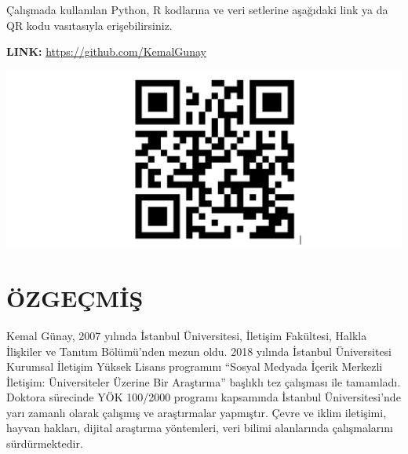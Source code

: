 \documentclass[
]{book}
\begin{document}
Çalışmada kullanılan Python, R kodlarına ve veri setlerine aşağıdaki link ya da QR kodu vasıtasıyla erişebilirsiniz.

\textbf{LINK:} \url{https://github.com/KemalGunay}

\includegraphics[width=0.95\linewidth,height=0.95\textheight]{tablolar-sekiller/karekod}

\hypertarget{uxf6zgeuxe7miux15f}{%
\chapter*{ÖZGEÇMİŞ}\label{uxf6zgeuxe7miux15f}}

Kemal Günay, 2007 yılında İstanbul Üniversitesi, İletişim Fakültesi, Halkla İlişkiler ve Tanıtım Bölümü'nden mezun oldu. 2018 yılında İstanbul Üniversitesi Kurumsal İletişim Yüksek Lisans programını ``Sosyal Medyada İçerik Merkezli İletişim: Üniversiteler Üzerine Bir Araştırma'' başlıklı tez çalışması ile tamamladı. Doktora sürecinde YÖK 100/2000 programı kapsamında İstanbul Üniversitesi'nde yarı zamanlı olarak çalışmış ve araştırmalar yapmıştır. Çevre ve iklim iletişimi, hayvan hakları, dijital araştırma yöntemleri, veri bilimi alanlarında çalışmalarını sürdürmektedir.

  
\end{document}
